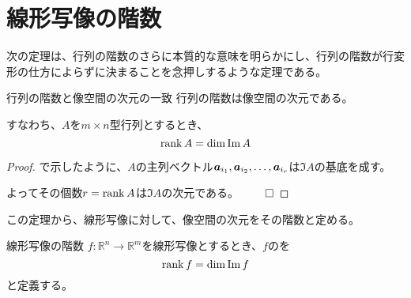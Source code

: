 \documentclass[../../../topic_linear-algebra]{subfiles}
\begin{document}
\sectionline
\section{線形写像の階数}

次の定理は、行列の階数のさらに本質的な意味を明らかにし、行列の階数が行変形の仕方によらずに決まることを念押しするような定理である。

\begin{theorem*}{行列の階数と像空間の次元の一致}
  行列の階数は像空間の次元である。

  すなわち、$A$を$m \times n$型行列とするとき、
  \begin{equation*}
    \rank A = \dim \Im A
  \end{equation*}
\end{theorem*}

\begin{proof}
  で示したように、$A$の主列ベクトル$\vb*{a}_{i_1}, \vb*{a}_{i_2}, \dots, \vb*{a}_{i_r}$は$\Im A$の基底を成す。

  よってその個数$r = \rank A$は$\Im A$の次元である。 $\qed$
\end{proof}

\br

この定理から、線形写像に対して、像空間の次元をその階数と定める。

\begin{definition}{線形写像の階数}\label{def:rank-of-linear-map}
  $f\colon \mathbb{R}^n \to \mathbb{R}^m$を線形写像とするとき、$f$のを
  \begin{equation*}
    \rank f = \dim \Im f
  \end{equation*}
  と定義する。
\end{definition}
\end{document}
